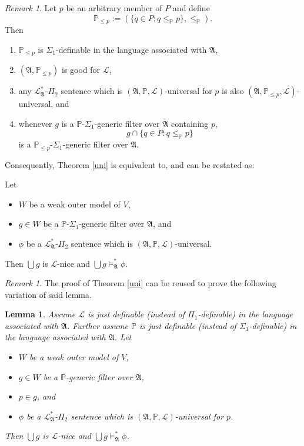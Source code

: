 \documentclass[12pt, twoside]{memoir}
\numberwithin{equation}{section}
\newtheorem{lem}[thm]{Lemma}
\theoremstyle{definition}
\theoremstyle{remark}
\newtheorem{rem}[thm]{Remark}
\theoremstyle{definition}
\theoremstyle{definition}
\newenvironment{customlem}[1]
  {\renewcommand\theinnercustomlem{#1}\innercustomlem}
  {\endinnercustomlem}
\theoremstyle{definition}
\theoremstyle{remark}
\begin{document}
\begin{rem}\label{endremmain}
Let $p$ be an arbitrary member of $P$ and define $$\mathbb{P}_{\leq p} := (\{q \in P : q \leq_{\mathbb{P}} p\}, \leq_{\mathbb{P}}).$$ Then 
\begin{enumerate}[label=(\arabic*)]
    \item $\mathbb{P}_{\leq p}$ is $\Sigma_1$-definable in the language associated with $\mathfrak{A}$, 
    \item $(\mathfrak{A}, \mathbb{P}_{\leq p})$ is good for $\mathcal{L}$, 
    \item any $\mathcal{L}^{*}_{\mathfrak{A}}$-$\Pi_2$ sentence which is $(\mathfrak{A}, \mathbb{P}, \mathcal{L})$-universal for $p$ is also $(\mathfrak{A}, \mathbb{P}_{\leq p}, \mathcal{L})$-universal, and
    \item whenever $g$ is a $\mathbb{P}$-$\Sigma_1$-generic filter over $\mathfrak{A}$ containing $p$, $$g \cap \{q \in P : q \leq_{\mathbb{P}} p\}$$ is a $\mathbb{P}_{\leq p}$-$\Sigma_1$-generic filter over $\mathfrak{A}$.
\end{enumerate}
Consequently, Theorem \ref{uni} is equivalent to, and can be restated as:
\end{rem}

\begin{customlem}{3.2.6$'$}\label{lem329p}
Let 
\begin{itemize} 
    \item $W$ be a weak outer model of $V$,
    \item $g \in W$ be a $\mathbb{P}$-$\Sigma_1$-generic filter over $\mathfrak{A}$, and
    \item $\phi$ be a $\mathcal{L}^{*}_{\mathfrak{A}}$-$\Pi_2$ sentence which is $(\mathfrak{A}, \mathbb{P}, \mathcal{L})$-universal.
\end{itemize} 
Then $\bigcup g$ is $\mathcal{L}$-nice and $\bigcup g \models^{*}_{\mathfrak{A}} \phi$.
\end{customlem}

\begin{rem}\label{rem331}
The proof of Theorem \ref{uni} can be reused to prove the following variation of said lemma.
\end{rem}

\begin{lem}\label{lem332}
Assume $\mathcal{L}$ is just definable (instead of $\Pi_1$-definable) in the language associated with $\mathfrak{A}$. Further assume $\mathbb{P}$ is just definable (instead of $\Sigma_1$-definable) in the language associated with $\mathfrak{A}$. Let 
\begin{itemize} 
    \item $W$ be a weak outer model of $V$,
    \item $g \in W$ be a $\mathbb{P}$-generic filter over $\mathfrak{A}$, 
    \item $p \in g$, and
    \item $\phi$ be a $\mathcal{L}^{*}_{\mathfrak{A}}$-$\Pi_2$ sentence which is $(\mathfrak{A}, \mathbb{P}, \mathcal{L})$-universal for $p$.
\end{itemize} 
Then $\bigcup g$ is $\mathcal{L}$-nice and $\bigcup g \models^{*}_{\mathfrak{A}} \phi$.
\end{lem}
\end{document}
